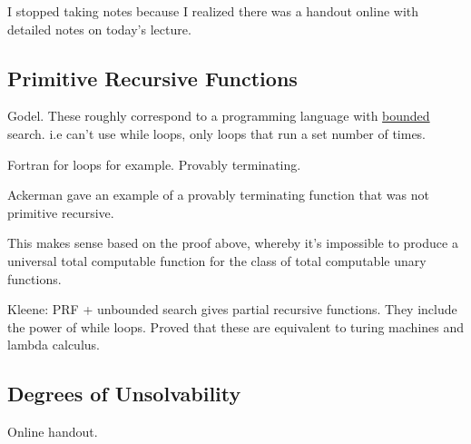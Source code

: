 \documentclass[../598comp.tex]{subfiles}
\begin{document}
I stopped taking notes because I realized there was a handout online with
detailed notes on today's lecture.

\subsection{Primitive Recursive Functions}

Godel. These roughly correspond to a programming language with \ul{bounded} search. i.e
can't use while loops, only loops that run a set number of times.

Fortran for loops for example. Provably terminating.

Ackerman gave an example of a provably terminating function that was not
primitive recursive.

This makes sense based on the proof above, whereby it's impossible to produce a
universal total computable function for the class of total computable unary functions.

Kleene: PRF + unbounded search gives partial recursive functions. They include
the power of while loops. Proved that these are equivalent to turing machines
and lambda calculus.

\subsection{Degrees of Unsolvability}

Online handout.
\end{document}
